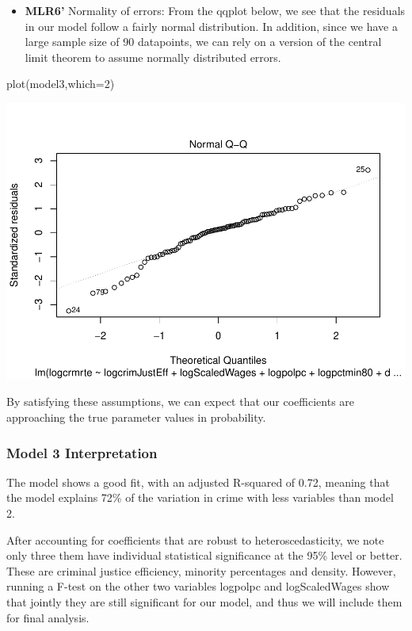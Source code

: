 \documentclass[]{article}
\newenvironment{Shaded}{}{}
\newcommand{\DataTypeTok}[1]{#1}
\newcommand{\DecValTok}[1]{#1}
\newcommand{\KeywordTok}[1]{\textcolor[rgb]{0.00,0.00,1.00}{#1}}
\newcommand{\NormalTok}[1]{#1}
\providecommand{\tightlist}{%
  \setlength{\itemsep}{0pt}\setlength{\parskip}{0pt}}
\begin{document}
\begin{itemize}
\tightlist
\item
  \textbf{MLR6'} Normality of errors: From the qqplot below, we see that
  the residuals in our model follow a fairly normal distribution. In
  addition, since we have a large sample size of 90 datapoints, we can
  rely on a version of the central limit theorem to assume normally
  distributed errors.
\end{itemize}

\begin{Shaded}
\begin{Highlighting}[]
\KeywordTok{plot}\NormalTok{(model3,}\DataTypeTok{which=}\DecValTok{2}\NormalTok{)}
\end{Highlighting}
\end{Shaded}

\includegraphics{Bagnard_Gaustad_Hartman_Leung_Lab_3_files/figure-latex/unnamed-chunk-87-1.pdf}

By satisfying these assumptions, we can expect that our coefficients are
approaching the true parameter values in probability.

\hypertarget{model-3-interpretation}{%
\subsubsection{Model 3 Interpretation}\label{model-3-interpretation}}

The model shows a good fit, with an adjusted R-squared of 0.72, meaning
that the model explains 72\% of the variation in crime with less
variables than model 2.

After accounting for coefficients that are robust to heteroscedasticity,
we note only three them have individual statistical significance at the
95\% level or better. These are criminal justice efficiency, minority
percentages and density. However, running a F-test on the other two
variables logpolpc and logScaledWages show that jointly they are still
significant for our model, and thus we will include them for final
analysis.
\end{document}
